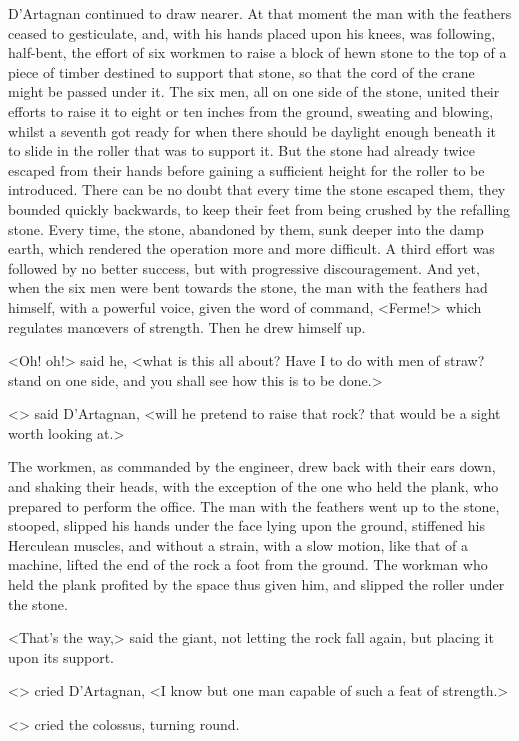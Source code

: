 D'Artagnan continued to draw nearer. At that moment the man with the feathers ceased to gesticulate, and, with his hands placed upon his knees, was following, half-bent, the effort of six workmen to raise a block of hewn stone to the top of a piece of timber destined to support that stone, so that the cord of the crane might be passed under it. The six men, all on one side of the stone, united their efforts to raise it to eight or ten inches from the ground, sweating and blowing, whilst a seventh got ready for when there should be daylight enough beneath it to slide in the roller that was to support it. But the stone had already twice escaped from their hands before gaining a sufficient height for the roller to be introduced. There can be no doubt that every time the stone escaped them, they bounded quickly backwards, to keep their feet from being crushed by the refalling stone. Every time, the stone, abandoned by them, sunk deeper into the damp earth, which rendered the operation more and more difficult. A third effort was followed by no better success, but with progressive discouragement. And yet, when the six men were bent towards the stone, the man with the feathers had himself, with a powerful voice, given the word of command, <Ferme!> which regulates manœvers of strength. Then he drew himself up.

<Oh! oh!> said he, <what is this all about? Have I to do with men of straw?  stand on one side, and you shall see how this is to be done.>

<> said D'Artagnan, <will he pretend to raise that rock? that would be a sight worth looking at.>

The workmen, as commanded by the engineer, drew back with their ears down, and shaking their heads, with the exception of the one who held the plank, who prepared to perform the office. The man with the feathers went up to the stone, stooped, slipped his hands under the face lying upon the ground, stiffened his Herculean muscles, and without a strain, with a slow motion, like that of a machine, lifted the end of the rock a foot from the ground. The workman who held the plank profited by the space thus given him, and slipped the roller under the stone.

<That's the way,> said the giant, not letting the rock fall again, but placing it upon its support.

<> cried D'Artagnan, <I know but one man capable of such a feat of strength.>

<> cried the colossus, turning round.

